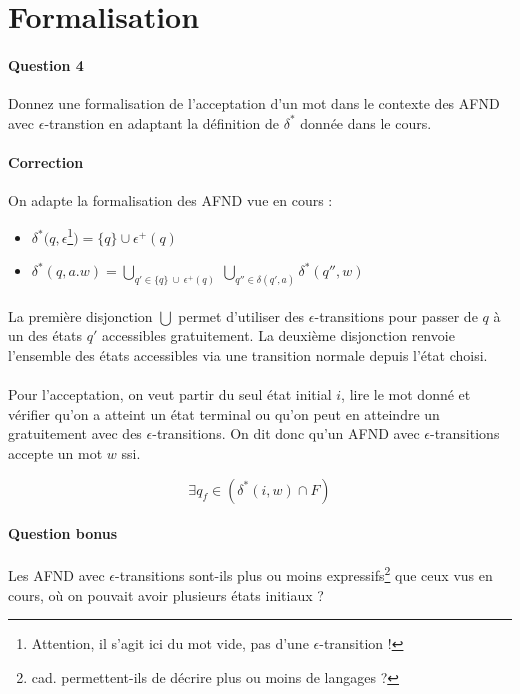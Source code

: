 \documentclass{article}[11pt]
\theoremstyle{definition}
\begin{document}
\section{Formalisation}

\paragraph*{Question 4} Donnez une formalisation de l'acceptation d'un mot dans le contexte des AFND avec $\epsilon$-transtion en adaptant la définition de $\delta^*$ donnée dans le cours.

\paragraph*{Correction} On adapte la formalisation des AFND vue en cours :
 
\begin{itemize}
\item $\delta^*(q,\epsilon$\footnote{Attention, il s'agit ici du mot vide, pas d'une $\epsilon$-transition !}$) = \{q\} \cup \epsilon^+(q)$
\item $\delta^*(q,a.w) = \displaystyle\bigcup_{q' \in \{q\}~\cup~ \epsilon^+(q)}~\displaystyle\bigcup_{q'' \in \delta(q',a)} \delta^*(q'',w)$
\end{itemize}

\paragraph*{}La première disjonction $\bigcup$ permet d'utiliser des $\epsilon$-transitions pour passer de $q$ à un des états $q'$ accessibles gratuitement. La deuxième disjonction renvoie l'ensemble des états accessibles via une transition normale depuis l'état choisi.

\paragraph*{}Pour l'acceptation, on veut partir du seul état initial $i$, lire le mot donné et vérifier qu'on a atteint un état terminal ou qu'on peut en atteindre un gratuitement avec des $\epsilon$-transitions. On dit donc qu'un AFND avec $\epsilon$-transitions accepte un mot $w$ ssi. 

\[
\exists q_f \in (\delta^*(i,w) \cap F)
\]


\paragraph*{Question bonus} Les AFND avec $\epsilon$-transitions sont-ils plus ou moins expressifs\footnote{cad. permettent-ils de décrire plus ou moins de langages ?} que ceux vus en cours, où on pouvait avoir plusieurs états initiaux ?
\end{document}
